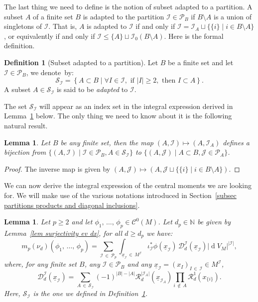 \documentclass[10pt]{amsart}
\newtheorem{lemm}[theo]{Lemma}\newtheorem{prop}[theo]{Proposition}\newtheorem{coro}[theo]{Corollary}\newtheorem{conj}[theo]{Conjecture}
\theoremstyle{definition}\newtheorem{defi}[theo]{Definition}\newtheorem{rema}[theo]{Remark}\newtheorem{exam}[theo]{Example}\newtheorem{exem}[theo]{Example}\newtheorem{nota}[theo]{Notation}
\DeclareMathOperator{\dmesure}{d}
\newcommand{\D}{\mathcal{D}}
\newcommand{\I}{\mathcal{I}}
\newcommand{\J}{\mathcal{J}}
\newcommand{\clC}{\mathcal{C}}
\newcommand{\clR}{\mathcal{R}}
\newcommand{\clS}{\mathcal{S}}
\newcommand{\pa}{\mathcal{P}\!}
\newcommand{\N}{\mathbb{N}}
\newcommand{\norm}[1]{\left\lvert #1 \right\rvert}
\renewcommand{\geq}{\geqslant}
\renewcommand{\leq}{\leqslant}
\let\oldforall\forall
\renewcommand*{\forall}{\mathrel{\oldforall}}
\begin{document}
The last thing we need to define is the notion of subset adapted to a partition. A subset $A$ of a finite set $B$ is adapted to the partition $\I \in \pa_B$ if $B \setminus A$ is a union of singletons of $\I$. That is, $A$ is adapted to $\I$ if and only if $\I = \I_A \sqcup \{\{i\} \mid i \in B \setminus A\}$, or equivalently if and only if $\I \leq \{A\} \sqcup \I_0(B \setminus A)$. Here is the formal definition.

\begin{defi}[{Subset adapted to a partition}]\label{def subset adapted to I}
Let $B$ be a finite set and let $\I \in \pa_B$, we denote~by:
\[
\clS_\I = \left\{A \subset B \middle\vert \forall I \in \I, \text{ if } \norm{I} \geq 2, \text{ then } I \subset A \right\}.
\]
A subset $A \in \clS_\I$ is said to be \emph{adapted} to $\I$.
\end{defi}

The set $\clS_\I$ will appear as an index set in the integral expression derived in Lemma~\ref{lem integral expression} below. The only thing we need to know about it is the following natural result.

\begin{lemm}\label{lem subsets adapted to I}
Let $B$ be any finite set, then the map $(A,\I) \mapsto (A,\I_A)$ defines a bijection from $\{(A,\I) \mid \I\in \pa_B, A \in \clS_\I \}$ to $\{ (A,\J) \mid A \subset B, \J \in \pa_A \}$.
\end{lemm}

\begin{proof}
The inverse map is given by $(A,\J) \mapsto (A, \J \sqcup \{\{i\} \mid i \in B \setminus A\})$.
\end{proof}

We can now derive the integral expression of the central moments we are looking for. We will make use of the various notations introduced in Section~\ref{subsec partitions products and diagonal inclusions}.

\begin{lemm}\label{lem integral expression}
Let $p \geq 2$ and let $\phi_1,\,\dots,\,\phi_p \in \clC^0(M)$. Let $d_p \in \N$ be given by Lemma~\ref{lem surjectivity ev dx}, for all $d \geq d_p$ we have:
\[
m_p(\nu_d)\left(\phi_1,\,\dots,\,\phi_p\right)= \sum_{\I\,\in\,\pa_p} \int_{\underline{x}_\I\,\in\,M^\I} \iota_\I^*\phi\left(\underline{x}_\I\right)\, \D^\I_d\left(\underline{x}_\I\right) \left|\dmesure\! V_{M}\right|^{\norm{\I}},
\]
where, for any finite set $B$, any $\I \in \pa_B$ and any $\underline{x}_\I = (x_I)_{I\,\in\,\I} \in M^\I$,
\[
\D^\I_d\left(\underline{x}_\I\right) = \sum_{A\,\in\,\clS_\I} (-1)^{\norm{B} - \norm{A}} \clR_d^{\norm{\I_A}}\left(\underline{x}_{\I_A}\right) \prod_{i\,\notin\,A} \clR_d^1\left(x_{\{i\}}\right).
\]
Here, $\clS_\I$ is the one we defined in Definition~\ref{def subset adapted to I}.
\end{lemm}
\end{document}
